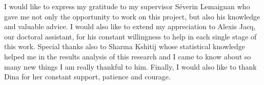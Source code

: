 I would like to express my gratitude to my supervisor S\'everin Lemaignan who gave me not only the opportunity to work on this project, but also his knowledge and valuable advice. I would also like to extend my appreciation to Alexis Jacq, our doctoral assistant, for his constant willingness to help in each single stage of this work. Special thanks also to Sharma Kshitij whose statistical knowledge helped me in the results analysis of this research and I came to know about so many new things I am really thankful to him. Finally, I would also like to thank Dina for her constant support, patience and courage.
\pagestyle{fancy}
